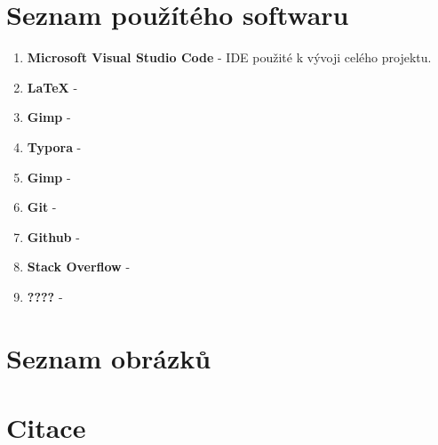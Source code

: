 \documentclass[12pt,a4paper]{report}
\begin{document}
  \chapter{Seznam použítého softwaru}
    \begin{enumerate}
      \item \textbf{Microsoft Visual Studio Code} - IDE použité k vývoji celého projektu.   
      \item \textbf{LaTeX} - 
      \item \textbf{Gimp} - 
      \item \textbf{Typora} - 
      \item \textbf{Gimp} -  
      \item \textbf{Git} -  
      \item \textbf{Github} -  
      \item \textbf{Stack Overflow} -  
      \item \textbf{????} - 
    \end{enumerate}
  \chapter{Seznam obrázků}
 
 
  \chapter{Citace}
\end{document}
